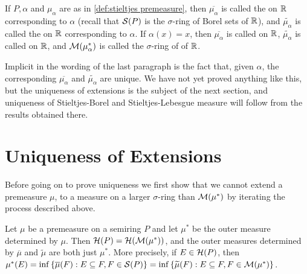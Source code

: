 \begin{definition}
If $P, \alpha$ and $\mu_\alpha$ are as in \ref{def:stieltjes premeasure}, then $\overline{\mu_\alpha}$ is called the  on $\mathbb{R}$ corresponding to $\alpha$ (recall that ${\cal S}(P)$ is the $\sigma$-ring of Borel sets of $\mathbb{R}$), and $\widetilde{\mu_\alpha}$ is called the  on $\mathbb{R}$ corresponding to $\alpha$. If $\alpha(x)=x$, then $\overline{\mu_\alpha}$ is called  on $\mathbb{R}$, $\widetilde{\mu_\alpha}$ is called  on $\mathbb{R}$, and ${\cal M}(\mu_\alpha^*)$ is called the $\sigma$-ring of  of $\mathbb{R}$.
\end{definition}

Implicit in the wording of the last paragraph is the fact that, given $\alpha$, the corresponding $\overline{\mu_\alpha}$ and $\widetilde{\mu_\alpha}$ are unique. We have not yet proved anything like this, but the uniqueness of extensions is the subject of the next section, and uniqueness of Stieltjes-Borel and Stieltjes-Lebesgue measure will follow from the results obtained there.

\section{Uniqueness of Extensions}

Before going on to prove uniqueness we first show that we cannot extend a premeasure $\mu$, to a measure on a larger $\sigma$-ring than ${\cal M}(\mu^*)$ by iterating the process described above.

\begin{proposition}\label{prop:repeated outer measure}
Let $\mu$ be a premeasure on a semiring $P$ and let $\mu^*$ be the outer measure determined by $\mu$. Then ${\cal H}(P)={\cal H}({\cal M}(\mu^*))$, and the outer measures determined by $\overline{\mu}$ and $\widetilde{\mu}$ are both just $\mu^*$. More precisely, if $E \in {\cal H}(P)$, then $\mu^*(E)=\inf \left\{\overline{\mu}(F):E\subseteq F,F\in {\cal S}(P)\right\}=\allowbreak\inf \left\{\widetilde{\mu}(F):E\subseteq F,F\in {\cal M}(\mu^*)\right\}$.
\end{proposition}

